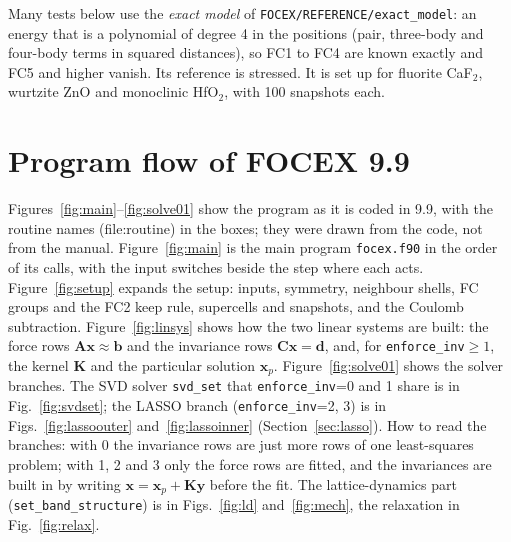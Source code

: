 \documentclass[11pt,a4paper]{article}
\newcommand{\bA}{\mathbf A}
\newcommand{\bC}{\mathbf C}
\newcommand{\bK}{\mathbf K}
\newcommand{\bx}{\mathbf x}
\newcommand{\by}{\mathbf y}
\newcommand{\bb}{\mathbf b}
\newcommand{\bd}{\mathbf d}
\newcommand{\code}[1]{\texttt{#1}}
\begin{document}
Many tests below use the \emph{exact model} of \code{FOCEX/REFERENCE/exact\_model}: an energy that is a
polynomial of degree 4 in the positions (pair, three-body and four-body terms in squared distances), so
FC1 to FC4 are known exactly and FC5 and higher vanish. Its reference is stressed. It is set up for
fluorite CaF$_2$, wurtzite ZnO and monoclinic HfO$_2$, with 100 snapshots each.

\section{Program flow of FOCEX 9.9}\label{sec:flow}
Figures~\ref{fig:main}--\ref{fig:solve01} show the program as it is coded in 9.9, with the routine names (file:routine)
in the boxes; they were drawn from the code, not from the manual. Figure~\ref{fig:main} is the main program
\code{focex.f90} in the order of its calls, with the input switches beside the step where each acts.
Figure~\ref{fig:setup} expands the setup: inputs, symmetry, neighbour shells, FC groups and the FC2 keep rule,
supercells and snapshots, and the Coulomb subtraction. Figure~\ref{fig:linsys} shows how the two linear systems are
built: the force rows $\bA\bx\approx\bb$ and the invariance rows $\bC\bx=\bd$, and, for \code{enforce\_inv}$\ge1$,
the kernel $\bK$ and the particular solution $\bx_p$. Figure~\ref{fig:solve01} shows the solver branches. The SVD
solver \code{svd\_set} that \code{enforce\_inv}=0 and 1 share is in Fig.~\ref{fig:svdset}; the LASSO branch
(\code{enforce\_inv}=2, 3) is in Figs.~\ref{fig:lassoouter} and~\ref{fig:lassoinner} (Section~\ref{sec:lasso}). How
to read the branches: with 0 the invariance rows are just more rows of one least-squares problem; with 1, 2 and 3
only the force rows are fitted, and the invariances are built in by writing $\bx=\bx_p+\bK\by$ before the fit.
The lattice-dynamics part (\code{set\_band\_structure}) is in Figs.~\ref{fig:ld} and~\ref{fig:mech}, the
relaxation in Fig.~\ref{fig:relax}.
\end{document}
